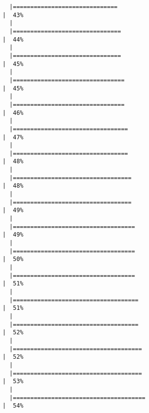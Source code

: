 \documentclass[
  letterpaper,
]{book}
\begin{document}
\begin{verbatim}
  |==============================                                        |  43%
  |                                                                            
  |===============================                                       |  44%
  |                                                                            
  |===============================                                       |  45%
  |                                                                            
  |================================                                      |  45%
  |                                                                            
  |================================                                      |  46%
  |                                                                            
  |=================================                                     |  47%
  |                                                                            
  |=================================                                     |  48%
  |                                                                            
  |==================================                                    |  48%
  |                                                                            
  |==================================                                    |  49%
  |                                                                            
  |===================================                                   |  49%
  |                                                                            
  |===================================                                   |  50%
  |                                                                            
  |===================================                                   |  51%
  |                                                                            
  |====================================                                  |  51%
  |                                                                            
  |====================================                                  |  52%
  |                                                                            
  |=====================================                                 |  52%
  |                                                                            
  |=====================================                                 |  53%
  |                                                                            
  |======================================                                |  54%

\end{verbatim}
\end{document}
